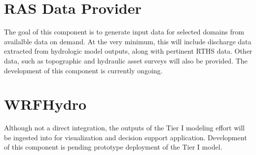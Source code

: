 \documentclass[letterpaper,12pt,english,openany,oneside]{sphinxmanual}
\begin{document}
\section{RAS Data Provider}
\label{\detokenize{euidev/integrations/index:ras-data-provider}}
\sphinxAtStartPar
The goal of this component is to generate  input data for selected domains from  availalble data on demand.  At the very minimum, this will include discharge data extracted from hydrologic model outputs, along with pertinent RTHS data. Other data, such as topographic and hydraulic asset surveys will also be provided. The development of this component is currently on\sphinxhyphen{}going.


\section{WRF\sphinxhyphen{}Hydro}
\label{\detokenize{euidev/integrations/index:wrf-hydro}}
\sphinxAtStartPar
Although not a direct integration, the outputs of the Tier I modeling effort will be ingested into  for visualization and decision support application.  Development of this component is pending prototype deployment of the Tier I model.

\sphinxstepscope
\end{document}
